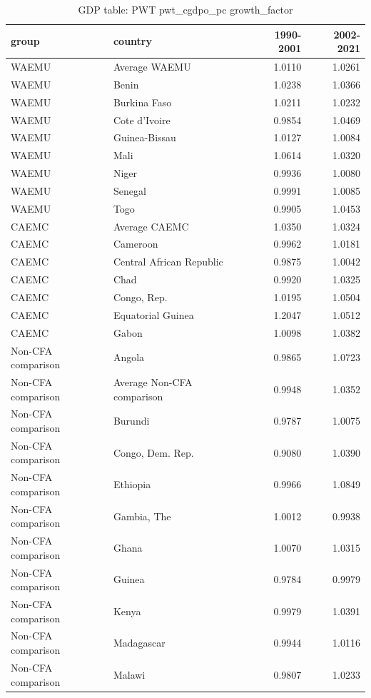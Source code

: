\begin{table}

\caption{GDP table: PWT pwt_cgdpo_pc growth_factor}
\centering
\begin{tabular}[t]{llrr}
\toprule
group & country & 1990-2001 & 2002-2021\\
\midrule
WAEMU & Average WAEMU & 1.0110 & 1.0261\\
WAEMU & Benin & 1.0238 & 1.0366\\
WAEMU & Burkina Faso & 1.0211 & 1.0232\\
WAEMU & Cote d'Ivoire & 0.9854 & 1.0469\\
WAEMU & Guinea-Bissau & 1.0127 & 1.0084\\
\addlinespace
WAEMU & Mali & 1.0614 & 1.0320\\
WAEMU & Niger & 0.9936 & 1.0080\\
WAEMU & Senegal & 0.9991 & 1.0085\\
WAEMU & Togo & 0.9905 & 1.0453\\
CAEMC & Average CAEMC & 1.0350 & 1.0324\\
\addlinespace
CAEMC & Cameroon & 0.9962 & 1.0181\\
CAEMC & Central African Republic & 0.9875 & 1.0042\\
CAEMC & Chad & 0.9920 & 1.0325\\
CAEMC & Congo, Rep. & 1.0195 & 1.0504\\
CAEMC & Equatorial Guinea & 1.2047 & 1.0512\\
\addlinespace
CAEMC & Gabon & 1.0098 & 1.0382\\
Non-CFA comparison & Angola & 0.9865 & 1.0723\\
Non-CFA comparison & Average Non-CFA comparison & 0.9948 & 1.0352\\
Non-CFA comparison & Burundi & 0.9787 & 1.0075\\
Non-CFA comparison & Congo, Dem. Rep. & 0.9080 & 1.0390\\
\addlinespace
Non-CFA comparison & Ethiopia & 0.9966 & 1.0849\\
Non-CFA comparison & Gambia, The & 1.0012 & 0.9938\\
Non-CFA comparison & Ghana & 1.0070 & 1.0315\\
Non-CFA comparison & Guinea & 0.9784 & 0.9979\\
Non-CFA comparison & Kenya & 0.9979 & 1.0391\\
\addlinespace
Non-CFA comparison & Madagascar & 0.9944 & 1.0116\\
Non-CFA comparison & Malawi & 0.9807 & 1.0233\\

\end{tabular}
\end{table}
